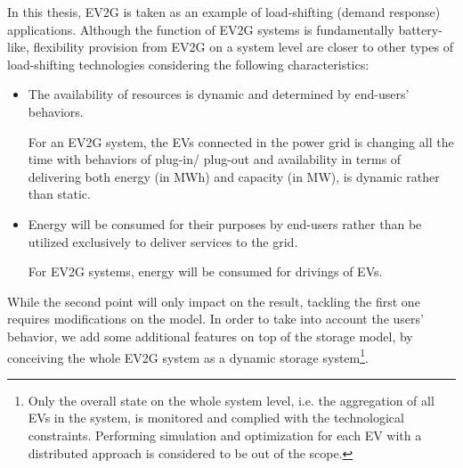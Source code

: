 In this thesis, EV2G is taken as an example of load-shifting (demand response) applications. Although the function of EV2G systems is fundamentally battery-like, flexibility provision from EV2G on a system level are closer to other types of load-shifting technologies considering the following characteristics:  


\begin{itemize}
	\item The availability of resources is dynamic and determined by end-users' behaviors. 
	
	For an EV2G system, the EVs connected in the power grid is changing all the time with behaviors of plug-in/ plug-out and availability in terms of delivering both energy (in MWh) and capacity (in MW), is dynamic rather than static.
	\item Energy will be consumed for their purposes by end-users rather than be utilized exclusively to deliver services to the grid. 
	
	For EV2G systems, energy will be consumed for drivings of EVs. 
\end{itemize}


While the second point will only impact on the result, tackling the first one requires modifications on the model. In order to take into account the users' behavior, we add some additional features on top of the storage model, by conceiving the whole EV2G system as a dynamic storage system\footnote{Only the overall state on the whole system level, i.e. the aggregation of all EVs in the system, is monitored and complied with the technological constraints. Performing simulation and optimization for each EV with a distributed approach is considered to be out of the scope.}.




